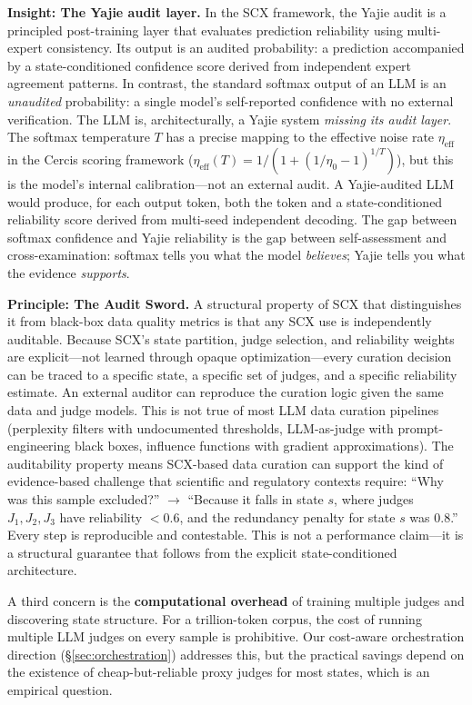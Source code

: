 \documentclass[11pt,twocolumn]{article}
\begin{document}
\textbf{Insight: The Yajie audit layer.} In the SCX framework, the Yajie audit is a principled post-training layer that evaluates prediction reliability using multi-expert consistency. Its output is an audited probability: a prediction accompanied by a state-conditioned confidence score derived from independent expert agreement patterns. In contrast, the standard softmax output of an LLM is an \textit{unaudited} probability: a single model's self-reported confidence with no external verification. The LLM is, architecturally, a Yajie system \textit{missing its audit layer}. The softmax temperature $T$ has a precise mapping to the effective noise rate $\eta_{\text{eff}}$ in the Cercis scoring framework ($\eta_{\text{eff}}(T) = 1/(1 + (1/\eta_0 - 1)^{1/T})$), but this is the model's internal calibration---not an external audit. A Yajie-audited LLM would produce, for each output token, both the token and a state-conditioned reliability score derived from multi-seed independent decoding. The gap between softmax confidence and Yajie reliability is the gap between self-assessment and cross-examination: softmax tells you what the model \textit{believes}; Yajie tells you what the evidence \textit{supports}.

\textbf{Principle: The Audit Sword.} A structural property of SCX that distinguishes it from black-box data quality metrics is that any SCX use is independently auditable. Because SCX's state partition, judge selection, and reliability weights are explicit---not learned through opaque optimization---every curation decision can be traced to a specific state, a specific set of judges, and a specific reliability estimate. An external auditor can reproduce the curation logic given the same data and judge models. This is not true of most LLM data curation pipelines (perplexity filters with undocumented thresholds, LLM-as-judge with prompt-engineering black boxes, influence functions with gradient approximations). The auditability property means SCX-based data curation can support the kind of evidence-based challenge that scientific and regulatory contexts require: ``Why was this sample excluded?'' $\to$ ``Because it falls in state $s$, where judges $J_1, J_2, J_3$ have reliability $< 0.6$, and the redundancy penalty for state $s$ was 0.8.'' Every step is reproducible and contestable. This is not a performance claim---it is a structural guarantee that follows from the explicit state-conditioned architecture.

A third concern is the \textbf{computational overhead} of training multiple judges and discovering state structure. For a trillion-token corpus, the cost of running multiple LLM judges on every sample is prohibitive. Our cost-aware orchestration direction (\S\ref{sec:orchestration}) addresses this, but the practical savings depend on the existence of cheap-but-reliable proxy judges for most states, which is an empirical question.
\end{document}
